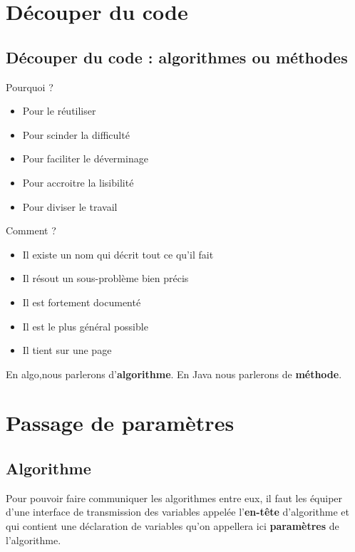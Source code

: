\documentclass[11pt,a4paper]{article}
\begin{document}
            \section{D\'ecouper du code}\subsection{D\'ecouper du code : algorithmes ou m\'ethodes}
      Pourquoi ?
      
					\begin{itemize}
				
			\item Pour le r\'eutiliser
			\item Pour scinder la difficult\'e
			\item Pour faciliter le d\'everminage
			\item Pour accroitre la lisibilit\'e
			\item Pour diviser le travail
					\end{itemize}
				
      Comment ?
      
					\begin{itemize}
				
			\item Il existe un nom qui d\'ecrit tout ce qu'il fait
			\item Il r\'esout un sous-probl\`eme bien pr\'ecis
			\item Il est fortement document\'e
			\item Il est le plus g\'en\'eral possible
			\item Il tient sur une page
					\end{itemize}
				
      En algo,nous parlerons d'\textbf{algorithme}.
      En Java nous parlerons de \textbf{m\'ethode}.
    \section{Passage de param\`etres}\subsection{Algorithme}
        Pour pouvoir faire communiquer les algorithmes entre eux, il faut les \'equiper d'une \guillemotleft  interface \guillemotright 
        de transmission des variables appel\'ee l'\textbf{en-t\^ete} d'algorithme et qui contient une d\'eclaration
        de variables qu'on appellera ici \textbf{param\`etres} de l'algorithme.
      
\end{document}
